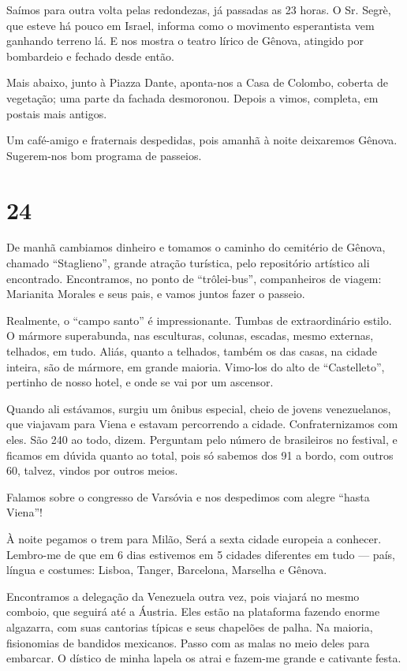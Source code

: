 Saímos para outra volta pelas redondezas, já passadas as 23 horas. O Sr. Segrè, que esteve há pouco em Israel, informa como o movimento esperantista vem ganhando terreno lá. E nos mostra o teatro lírico de Gênova, atingido por bombardeio e fechado desde então.

Mais abaixo, junto à Piazza Dante, aponta-nos a Casa de Colombo, coberta de vegetação; uma parte da fachada desmoronou. Depois a vimos, completa, em postais mais antigos.

Um café-amigo e fraternais despedidas, pois amanhã à noite deixaremos Gênova. Sugerem-nos bom programa de passeios.

\section*{24 \adfflatleafright {}}
De manhã cambiamos dinheiro e tomamos o caminho do cemitério de Gênova, chamado ``Staglieno'', grande atração turística, pelo repositório artístico ali encontrado. Encontramos, no ponto de ``trôlei-bus'', companheiros de viagem: Marianita Morales e seus pais, e vamos juntos fazer o passeio.

Realmente, o ``campo santo'' é impressionante. Tumbas de extraordinário estilo. O mármore superabunda, nas esculturas, colunas, escadas, mesmo externas, telhados, em tudo. Aliás, quanto a telhados, também os das casas, na cidade inteira, são de mármore, em grande maioria. Vimo-los do alto de ``Castelleto'', pertinho de nosso hotel, e onde se vai por um ascensor.

Quando ali estávamos, surgiu um ônibus especial, cheio de jovens venezuelanos, que viajavam para Viena e estavam percorrendo a cidade. Confraternizamos com eles. São 240 ao todo, dizem. Perguntam pelo número de brasileiros no festival, e ficamos em dúvida quanto ao total, pois só sabemos dos 91 a bordo, com outros 60, talvez, vindos por outros meios.

Falamos sobre o congresso de Varsóvia e nos despedimos com alegre ``hasta Viena''!

À noite pegamos o trem para Milão, Será a sexta cidade europeia a conhecer. Lembro-me de que em 6 dias estivemos em 5 cidades diferentes em tudo --- país, língua e costumes: Lisboa, Tanger, Barcelona, Marselha e Gênova.

Encontramos a delegação da Venezuela outra vez, pois viajará no mesmo comboio, que seguirá até a Áustria. Eles estão na plataforma fazendo enorme algazarra, com suas cantorias típicas e seus chapelões de palha. Na maioria, fisionomias de bandidos mexicanos. Passo com as malas no meio deles para embarcar. O dístico de minha lapela os atrai e fazem-me grande e cativante festa.

